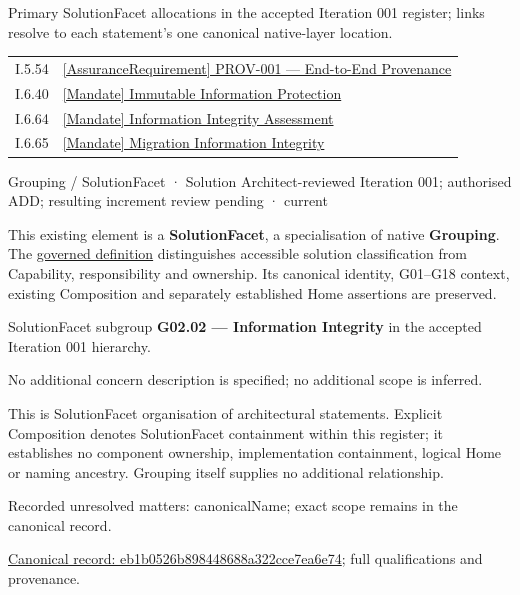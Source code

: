 Primary SolutionFacet allocations in the accepted Iteration 001 register; links resolve to each statement’s one canonical native-layer location.\par
\begin{longtable}{p{.22\linewidth}p{.73\linewidth}}
I.5.54 & \hyperref[element:3e45e60affb44bf384d54de26d3add6a]{[AssuranceRequirement] PROV-001 — End-to-End Provenance} \\
I.6.40 & \hyperref[element:4a25d9c8aaa9418fbddb5bff7302c46d]{[Mandate] Immutable Information Protection} \\
I.6.64 & \hyperref[element:6316761bfd414032a8d889c7ba34131d]{[Mandate] Information Integrity Assessment} \\
I.6.65 & \hyperref[element:22583ccb89dc4cf683c710760bc4b1f2]{[Mandate] Migration Information Integrity} \\
\end{longtable}
\label{element:eb1b0526b898448688a322cce7ea6e74}
{\small Grouping / SolutionFacet · Solution Architect-reviewed Iteration 001; authorised ADD; resulting increment review pending · current}\par

This existing element is a \textbf{SolutionFacet}, a specialisation of native
\textbf{Grouping}. The \href{\detokenize{../../../../../../../governance/continuum-representation.md#solutionfacet-classification--1119-candidate}}{governed definition}
distinguishes accessible solution classification from Capability, responsibility
and ownership. Its canonical identity, G01–G18 context, existing Composition
and separately established Home assertions are preserved.



SolutionFacet subgroup \textbf{G02.02 — Information Integrity} in the accepted Iteration 001 hierarchy.



No additional concern description is specified; no additional scope is inferred.



This is SolutionFacet organisation of architectural statements. Explicit Composition denotes SolutionFacet containment within this register; it establishes no component ownership, implementation containment, logical Home or naming ancestry. Grouping itself supplies no additional relationship.


{\small Recorded unresolved matters: canonicalName; exact scope remains in the canonical record.}\par
{\footnotesize \href{../../../../../../../continuum/grouping/eb1b0526b898448688a322cce7ea6e74.md}{Canonical record: eb1b0526b898448688a322cce7ea6e74}; full qualifications and provenance.}\par
